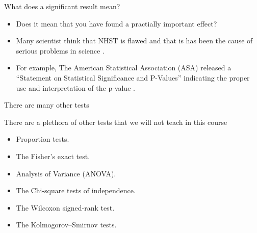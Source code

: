 \documentclass[handout]{beamer}
\begin{document}
\begin{frame}{What does a significant result mean?}
\scriptsize{
\begin{itemize}

 \item  Does it mean that you have found a practially important effect?
\item  Many scientist think that NHST is flawed and that is has been the cause of serious problems in science \cite{poldrack2019statistical}.

 \item For example, The American Statistical Association (ASA) released a ``Statement on Statistical Significance and P-Values'' indicating the proper use and interpretation of the p-value \cite{wasserstein2016asa}.
 
\end{itemize}
}
 
\end{frame}


\begin{frame}{There are many other tests}
 \scriptsize{
There are a plethora of other tests that we will not teach in this course
 
\begin{itemize}
 \item Proportion tests.
 \item The Fisher's exact test.
 \item Analysis of Variance (ANOVA).
 \item The Chi-square tests of independence.
 \item The Wilcoxon signed-rank test.
 \item The Kolmogorov–Smirnov tests. 
 
\end{itemize}


}
\end{frame}
\end{document}
